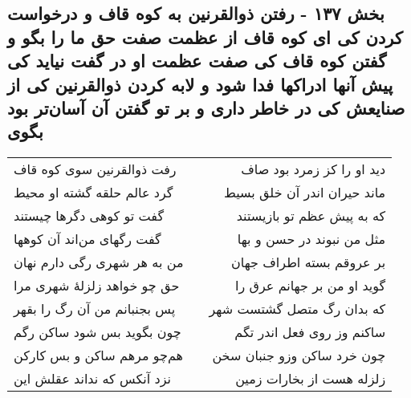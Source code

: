 \begin{center}
\section*{بخش ۱۳۷ - رفتن ذوالقرنین به کوه قاف و درخواست کردن کی ای کوه قاف از عظمت صفت حق ما را بگو و گفتن کوه قاف کی صفت عظمت او در گفت نیاید  کی پیش آنها ادراکها فدا شود و لابه کردن ذوالقرنین کی از صنایعش کی در خاطر داری و بر تو گفتن آن آسان‌تر بود بگوی}
\label{sec:sh137}
\begin{longtable}{l p{0.5cm} r}
رفت ذوالقرنین سوی کوه قاف
&&
دید او را کز زمرد بود صاف
\\
گرد عالم حلقه گشته او محیط
&&
ماند حیران اندر آن خلق بسیط
\\
گفت تو کوهی دگرها چیستند
&&
که به پیش عظم تو بازیستند
\\
گفت رگهای من‌اند آن کوهها
&&
مثل من نبوند در حسن و بها
\\
من به هر شهری رگی دارم نهان
&&
بر عروقم بسته اطراف جهان
\\
حق چو خواهد زلزلهٔ شهری مرا
&&
گوید او من بر جهانم عرق را
\\
پس بجنبانم من آن رگ را بقهر
&&
که بدان رگ متصل گشتست شهر
\\
چون بگوید بس شود ساکن رگم
&&
ساکنم وز روی فعل اندر تگم
\\
هم‌چو مرهم ساکن و بس کارکن
&&
چون خرد ساکن وزو جنبان سخن
\\
نزد آنکس که نداند عقلش این
&&
زلزله هست از بخارات زمین
\\
\end{longtable}
\end{center}
